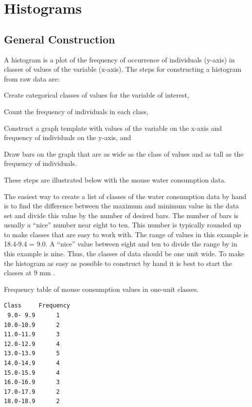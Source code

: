 \documentclass[10pt,openany]{book}\usepackage[]{graphicx}\usepackage[]{color}
\begin{document}
\section{Histograms}
\vspace{-8pt}
\subsection{General Construction}
\vspace{-8pt}
A histogram is a plot of the frequency of occurrence of individuals (y-axis) in classes of values of the variable (x-axis).  The steps for constructing a histogram from raw data are:
\vspace{-6pt}
\begin{Enumerate}
  \item Create categorical classes of values for the variable of interest,
  \item Count the frequency of individuals in each class,
  \item Construct a graph template with values of the variable on the x-axis and frequency of individuals on the y-axis, and
  \item Draw bars on the graph that are as wide as the class of values and as tall as the frequency of individuals.
\end{Enumerate}
These steps are illustrated below with the mouse water consumption data.

The easiest way to create a list of classes of the water consumption data by hand is to find the difference between the maximum and minimum value in the data set and divide this value by the number of desired bars.  The number of bars is usually a ``nice'' number near eight to ten.  This number is typically rounded up to make classes that are easy to work with.  The range of values in this example is 18.4-9.4 = 9.0.  A ``nice'' value between eight and ten to divide the range by in this example is nine.  Thus, the classes of data should be one unit wide.  To make the histogram as easy as possible to construct by hand it is best to start the classes at 9 mm .

\begin{table}[htbp]
  \caption{Frequency table of mouse consumption values in one-unit classes.}
  \label{tab:MouseFreqTable}
    \begin{Verbatim}[xleftmargin=5mm]
Class     Frequency
 9.0- 9.9      1
10.0-10.9      2
11.0-11.9      3
12.0-12.9      4
13.0-13.9      5
14.0-14.9      4
15.0-15.9      4
16.0-16.9      3
17.0-17.9      2
18.0-18.9      2
    \end{Verbatim}
\end{table}
\end{document}
